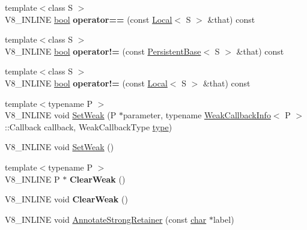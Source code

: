\begin{DoxyCompactItemize}
{\footnotesize template$<$class S $>$ }\\V8\+\_\+\+I\+N\+L\+I\+NE \mbox{\hyperlink{classbool}{bool}} {\bfseries operator==} (const \mbox{\hyperlink{classv8_1_1Local}{Local}}$<$ S $>$ \&that) const
\item 
\mbox{\label{classv8_1_1PersistentBase_a2893d38e56559c016e33e832b814a515}} 
{\footnotesize template$<$class S $>$ }\\V8\+\_\+\+I\+N\+L\+I\+NE \mbox{\hyperlink{classbool}{bool}} {\bfseries operator!=} (const \mbox{\hyperlink{classv8_1_1PersistentBase}{Persistent\+Base}}$<$ S $>$ \&that) const
\item 
\mbox{\label{classv8_1_1PersistentBase_a6bfcb31182bcc9a2cc20b83807f7fb45}} 
{\footnotesize template$<$class S $>$ }\\V8\+\_\+\+I\+N\+L\+I\+NE \mbox{\hyperlink{classbool}{bool}} {\bfseries operator!=} (const \mbox{\hyperlink{classv8_1_1Local}{Local}}$<$ S $>$ \&that) const
\item 
{\footnotesize template$<$typename P $>$ }\\V8\+\_\+\+I\+N\+L\+I\+NE void \mbox{\hyperlink{classv8_1_1PersistentBase_aebb8a2c97e219102f613ff3749c956f6}{Set\+Weak}} (P $\ast$parameter, typename \mbox{\hyperlink{classv8_1_1WeakCallbackInfo}{Weak\+Callback\+Info}}$<$ P $>$\+::Callback callback, Weak\+Callback\+Type \mbox{\hyperlink{classstd_1_1conditional_1_1type}{type}})
\item 
V8\+\_\+\+I\+N\+L\+I\+NE void \mbox{\hyperlink{classv8_1_1PersistentBase_a09fd1d1c3cd3ff32b91937f4d8beb1ea}{Set\+Weak}} ()
\item 
\mbox{\label{classv8_1_1PersistentBase_a444d27c00650e3663348024df08cb121}} 
{\footnotesize template$<$typename P $>$ }\\V8\+\_\+\+I\+N\+L\+I\+NE P $\ast$ {\bfseries Clear\+Weak} ()
\item 
\mbox{\label{classv8_1_1PersistentBase_afe515daead108cceb1699b54051df13b}} 
V8\+\_\+\+I\+N\+L\+I\+NE void {\bfseries Clear\+Weak} ()
\item 
V8\+\_\+\+I\+N\+L\+I\+NE void \mbox{\hyperlink{classv8_1_1PersistentBase_a27ddb6118b13225207e9641c1e6c8c91}{Annotate\+Strong\+Retainer}} (const \mbox{\hyperlink{classchar}{char}} $\ast$label)
\item 

\end{DoxyCompactItemize}
